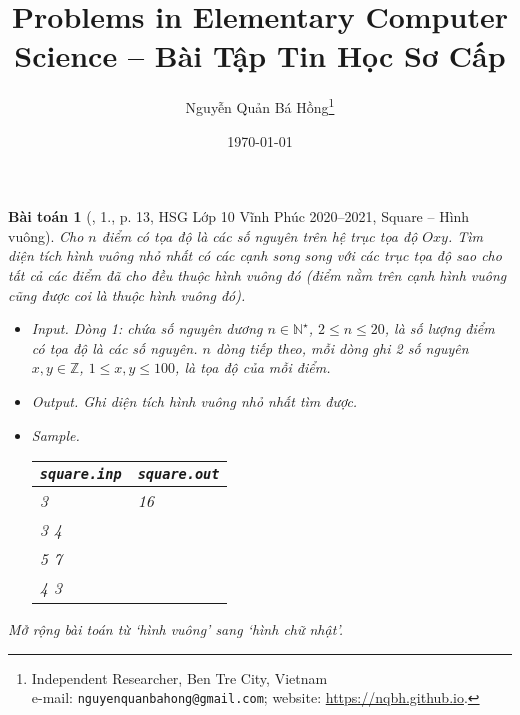 \documentclass{article}
\title{Problems in Elementary Computer Science -- Bài Tập Tin Học Sơ Cấp}
\author{Nguyễn Quản Bá Hồng\footnote{Independent Researcher, Ben Tre City, Vietnam\\e-mail: \texttt{nguyenquanbahong@gmail.com}; website: \url{https://nqbh.github.io}.}}
\date{\today}
\newtheorem{baitoan}{Bài toán}
\begin{document}
\maketitle


\begin{baitoan}[\cite{Trung_HSG_THPT_Tin}, 1., p. 13, HSG Lớp 10 Vĩnh Phúc 2020--2021, Square -- Hình vuông]
	Cho $n$ điểm có tọa độ là các số nguyên trên hệ trục tọa độ $Oxy$. Tìm diện tích hình vuông nhỏ nhất có các cạnh song song với các trục tọa độ sao cho tất cả các điểm đã cho đều thuộc hình vuông đó (điểm nằm trên cạnh hình vuông cũng được coi là thuộc hình vuông đó).
	\begin{itemize}
		\item {\sf Input.} Dòng 1: chứa số nguyên dương $n\in\mathbb{N}^\star$, $2\le n\le20$, là số lượng điểm có tọa độ là các số nguyên. $n$ dòng tiếp theo, mỗi dòng ghi 2 số nguyên $x,y\in\mathbb{Z}$, $1\le x,y\le100$, là tọa độ của mỗi điểm.
		\item {\sf Output.} Ghi diện tích hình vuông nhỏ nhất tìm được.
		\item {\sf Sample.}
		\begin{table}[H]
			\centering
			\begin{tabular}{|l|l|}
				\hline
				{\tt square.inp} & {\tt square.out} \\
				\hline
				3 & 16 \\
				3 4 &  \\
				5 7 &  \\
				4 3 &  \\
				\hline
			\end{tabular}
		\end{table}
	\end{itemize}
	Mở rộng bài toán từ `hình vuông' sang `hình chữ nhật'.
\end{baitoan}
\end{document}
